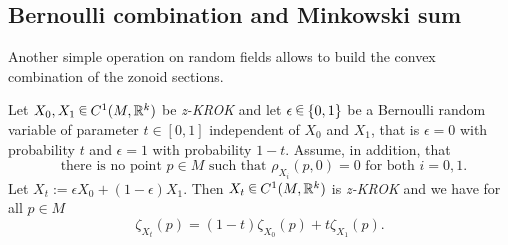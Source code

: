 \documentclass[AHL, Unicode, longabstracts, published]{cedram}
\newcommand{\R}{\mathbb{R}}
\newcommand{\zkrok}{\emph{z-KROK}\xspace}
\newcommand*\randin{
\mathchoice {\raisebox{-.35ex}{$\displaystyle{^\subset}$}\mkern-11.5mu\raisebox{+.45ex}{$\displaystyle{_\subset}$}} {\mkern+1mu\raisebox{-.27ex}{$\textstyle{^\subset}$}\mkern-11.7mu\raisebox{+.45ex}{$\textstyle{_\subset}$}} {\raisebox{.35ex}{$\scriptstyle\subset$}\mkern-14mu\raisebox{-.15ex}{$\scriptstyle\subset$}} {\raisebox{.3ex}{$\scriptscriptstyle\subset$}\mkern-13.5mu\raisebox{-.10ex}{$\scriptscriptstyle\subset$}}}
\begin{document}
\subsection{Bernoulli combination and Minkowski sum}

Another simple operation on random fields allows to build the convex combination of the zonoid sections.

\begin{prop}\label{prop:bern}
Let $X_0,X_1\,\randin\, C^1(M,\R^k)$ be {\zkrok} and let $\epsilon\,\randin\,\{0,1\}$ be a Bernoulli random variable of parameter $t\in[0,1]$ independent of $X_0$ and $X_1$, that is $\epsilon=0$ with probability $t$ and $\epsilon=1$ with probability $1-t$. Assume, in addition, that
\begin{equation}\label{hyp:bern}
\tag{$*$}\ \text{ there is no point }p\in M\text{ such that }\rho_{X_i}(p,0)=0\text{ for both }i=0,1.
\end{equation}
Let $X_t:=\epsilon X_0 + (1-\epsilon)X_1$. Then $X_t\,\randin\, C^1(M,\R^k)$ is {\zkrok} and we have for all $p\in M$
\begin{equation*}
\zeta_{X_t}(p)=(1-t)\zeta_{X_0}(p)+t\zeta_{X_1}(p).
\end{equation*}
\end{prop}
\end{document}
